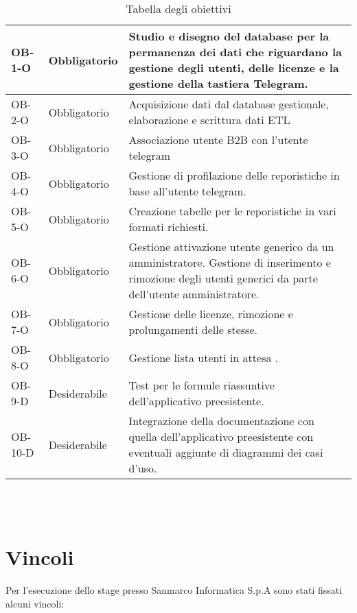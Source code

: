 \begin{table}
\begin{tabular}{ |p{2cm}|p{3cm}|p{8cm}| }
 \hline
  OB-1-O &  Obbligatorio   & Studio e disegno del database per la permanenza dei dati che riguardano la gestione degli utenti, delle licenze e la gestione della tastiera Telegram.\\
 \hline
OB-2-O &   Obbligatorio  &  Acquisizione dati dal database gestionale, elaborazione  e scrittura dati ETL \\
 \hline
 OB-3-O &   Obbligatorio  &  Associazione utente B2B con l'utente telegram \\
 \hline
 OB-4-O & Obbligatorio & Gestione di profilazione delle reporistiche in base all'utente telegram.\\
\hline
OB-5-O  & Obbligatorio & Creazione tabelle per le reporistiche in vari formati richiesti. \\
\hline
OB-6-O  &  Obbligatorio  & Gestione attivazione utente generico da un amministratore. Gestione di inserimento e rimozione degli utenti generici da parte dell'utente amministratore.\\
\hline  
OB-7-O & Obbligatorio & Gestione delle licenze, rimozione e prolungamenti delle stesse. \\
\hline
OB-8-O & Obbligatorio & Gestione lista utenti in attesa . \\
\hline
OB-9-D & Desiderabile & Test per le formule riassuntive dell'applicativo preesistente. \\
\hline
OB-10-D & Desiderabile & Integrazione della documentazione con quella  dell'applicativo preesistente con eventuali aggiunte di diagrammi dei casi d'uso. \\
\hline

\end{tabular}
\\\\
\caption{Tabella degli obiettivi}
\end{table}




\clearpage
\section{Vincoli}
Per l'esecuzione dello stage presso Sanmarco Informatica S.p.A sono stati fissati alcuni vincoli: 

